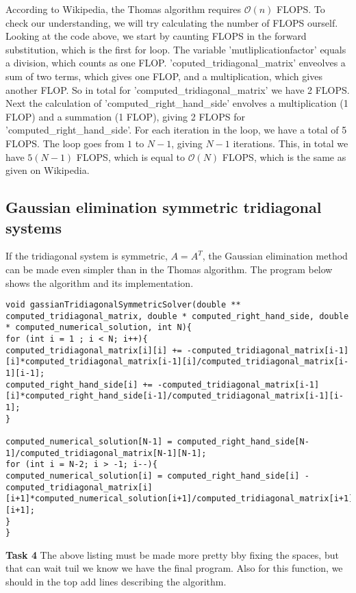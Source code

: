 \documentclass{article}
\begin{document}
According to Wikipedia, the Thomas algorithm requires $\mathcal{O}(n)$ FLOPS. To check our understanding, we will try calculating the number of FLOPS ourself. Looking at the code above, we start by caunting FLOPS in the forward substitution, which is the first for loop. The variable 'mutliplicationfactor' equals a division, which counts as one FLOP. 'coputed_tridiagonal_matrix' enveolves a sum of two terms, which gives one FLOP, and a multiplication, which gives another FLOP. So in total for 'computed_tridiagonal_matrix' we have 2 FLOPS. Next the calculation of 'computed_right_hand_side' envolves a multiplication (1 FLOP) and a summation (1 FLOP), giving 2 FLOPS for 'computed_right_hand_side'. For each iteration in the loop, we have a total of 5 FLOPS. The loop goes from $1$ to $N-1$, giving $N-1$ iterations. This, in total we have $5(N-1)$ FLOPS, which is equal to $\mathcal{O}(N)$ FLOPS, which is the same as given on Wikipedia.

\subsection{Gaussian elimination symmetric tridiagonal systems}
If the tridiagonal system is symmetric, $A = A^T$, the Gaussian elimination method can be made even simpler than in the Thomas algorithm. The program below shows the algorithm and its implementation.

\begin{lstlisting}
void gassianTridiagonalSymmetricSolver(double ** computed_tridiagonal_matrix, double * computed_right_hand_side, double * computed_numerical_solution, int N){
for (int i = 1 ; i < N; i++){
computed_tridiagonal_matrix[i][i] += -computed_tridiagonal_matrix[i-1][i]*computed_tridiagonal_matrix[i-1][i]/computed_tridiagonal_matrix[i-1][i-1];
computed_right_hand_side[i] += -computed_tridiagonal_matrix[i-1][i]*computed_right_hand_side[i-1]/computed_tridiagonal_matrix[i-1][i-1];
}

computed_numerical_solution[N-1] = computed_right_hand_side[N-1]/computed_tridiagonal_matrix[N-1][N-1];
for (int i = N-2; i > -1; i--){
computed_numerical_solution[i] = computed_right_hand_side[i] - computed_tridiagonal_matrix[i][i+1]*computed_numerical_solution[i+1]/computed_tridiagonal_matrix[i+1][i+1];
}
}
\end{lstlisting}

\textbf{Task 4} The above listing must be made more pretty bby fixing the spaces, but that can wait tuil we know we have the final program. Also for this function, we should in the top add lines describing the algorithm.\\
\end{document}
